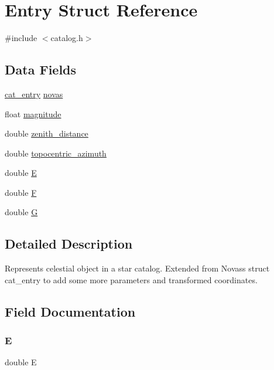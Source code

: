 \hypertarget{struct_entry}{}\section{Entry Struct Reference}
\label{struct_entry}


{\ttfamily \#include $<$catalog.\+h$>$}

\subsection*{Data Fields}
\begin{DoxyCompactItemize}
\item 
\mbox{\hyperlink{novas_8h_a262daaa71cede05205cfaa727313c1f3}{cat\+\_\+entry}} \mbox{\hyperlink{struct_entry_ac03920d0c64ed555ac71b25d04edd35e}{novas}}
\item 
float \mbox{\hyperlink{struct_entry_a90598eb01c338f4bbab41ad4aab9fcc0}{magnitude}}
\item 
double \mbox{\hyperlink{struct_entry_a3c2f9054e85abef611e387ff641fe831}{zenith\+\_\+distance}}
\item 
double \mbox{\hyperlink{struct_entry_a3aedc50fa1c1d11c9d2c89c341a0b866}{topocentric\+\_\+azimuth}}
\item 
double \mbox{\hyperlink{struct_entry_a1eb62b8cb1f5e5f571d51179718e7d4c}{E}}
\item 
double \mbox{\hyperlink{struct_entry_ae3520ebb3ff8d6feab3e6afb47ed4040}{F}}
\item 
double \mbox{\hyperlink{struct_entry_a67783a2c4f670ee5a9dadcf428324d32}{G}}
\end{DoxyCompactItemize}


\subsection{Detailed Description}
Represents celestial object in a star catalog. Extended from Novas\textquotesingle{}s struct cat\+\_\+entry to add some more parameters and transformed coordinates. 

\subsection{Field Documentation}
\mbox{\label{struct_entry_a1eb62b8cb1f5e5f571d51179718e7d4c}} 
\subsubsection{\texorpdfstring{E}{E}}
{\footnotesize\ttfamily double E}

